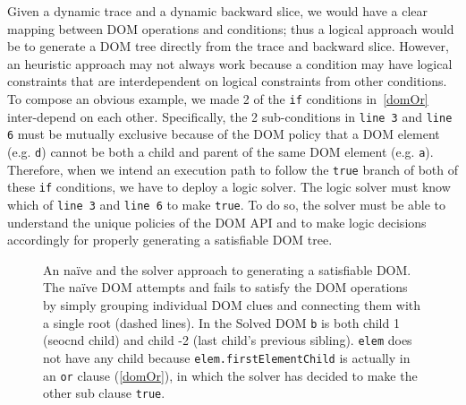 Given a dynamic trace and a dynamic backward slice, we would have a clear mapping between DOM operations and conditions; 
thus a logical approach would be to generate a DOM tree directly from the trace and backward slice.  
However, an heuristic approach may not always work because a condition may have logical constraints that are interdependent on logical constraints from other conditions.  
To compose an obvious example, we made 2 of the {\tt if} conditions in~\autoref{domOr} inter-depend on each other.
Specifically, the 2 sub-conditions in {\tt line 3} and {\tt line 6} must be mutually exclusive because of the DOM policy that a DOM element (e.g. {\tt d}) cannot be both a child and parent of the same DOM element (e.g. {\tt a}).  
Therefore, when we intend an execution path to follow the {\tt true} branch of both of these {\tt if} conditions, we have to deploy a logic solver.  
The logic solver must know which of {\tt line 3} and {\tt line 6} to make {\tt true}.  
To do so, the solver must be able to understand the unique policies of the DOM API and to make logic decisions accordingly for properly generating a satisfiable DOM tree.  


\begin{figure}[ht]
\centerline{}
\caption[Naive vs. Solved DOM trees]{An na\"{i}ve and the solver approach to generating a satisfiable DOM.  The na\"{i}ve DOM attempts and fails to satisfy the DOM operations by simply grouping individual DOM clues and connecting them with a single root (dashed lines).  In the Solved DOM {\tt b} is both child 1 (seocnd child) and child -2 (last child's previous sibling).  {\tt elem} does not have any child because {\tt elem.firstElementChild} is actually in an {\tt or} clause (\autoref{domOr}), in which the solver has decided to make the other sub clause {\tt true}.}
\label{trees}
\end{figure}


